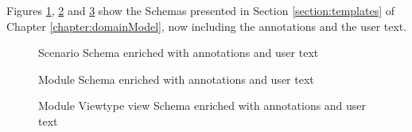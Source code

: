 Figures \ref{figure:scenarioTemplate2}, \ref{figure:moduleTemplate2} and \ref{figure:viewTemplate2} show the Schemas presented in Section \ref{section:templates} of Chapter \ref{chapter:domainModel}, now including the annotations and the user text.

\begin{figure}[h]
\centering

\caption{Scenario Schema enriched with annotations and user text}
\label{figure:scenarioTemplate2}
\end{figure}

\begin{figure}[h]
\centering

\caption{Module Schema enriched with annotations and user text}
\label{figure:moduleTemplate2}
\end{figure}

\begin{figure}[h]
\centering

\caption{Module Viewtype view Schema enriched with annotations and user text}
\label{figure:viewTemplate2}
\end{figure}















